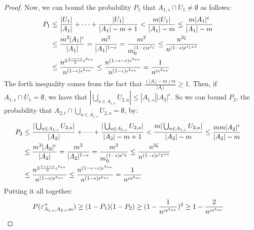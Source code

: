 \begin{lemma}[Claim 4.13]
\begin{proof}
            Now, we can bound the probability $P_1$ that $A_{1,s} \cap U_1 \neq \emptyset$ as follows:
            \[
                \begin{split}
                    P_1
                        & \leq \frac{|U_1|}{|A_1|} + \dots + \frac{|U_1|}{|A_1|-m+1}
                            < \frac{m |U_1|}{|A_1| - m}
                            \leq \frac{m |A_1|^\epsilon}{|A_1| - m} \\
                        & \leq \frac{m^2 |A_1|^\epsilon}{|A_1|}
                            = \frac{m^2}{|A_1|^{1-\epsilon}}
                            = \frac{m^2}{m_0^{\parround{1-\epsilon} \epsilon^{\ell_1}}} %
                            \leq \frac{n^{2 \zeta}}{n^{(1-\epsilon)\epsilon^{\ell_1 + 1}}} \\
                        & \leq \frac{n^{2\frac{1-\epsilon-c}{3} \epsilon^{k_{**}}}}{n^{(1-\epsilon)\epsilon^{k_{**}}}}
                            \leq \frac{n^{(1-\epsilon-c) \epsilon^{k_{**}}}}{n^{(1-\epsilon)\epsilon^{k_{**}}}}
                            = \frac{1}{n^{c \epsilon^{k_{**}}}}
                \end{split}
            \]
            The forth inequality comes from the fact that $\frac{(|A_i| - m) m}{|A_i|} \geq 1$.
            Then, if $A_{1,s} \cap U_1= \emptyset$, we have that $|\bigcup_{a \in A_{1,s}} U_{2,a}| \leq |A_{1,s}| |A_2|^\epsilon$.
            So we can bound $P_2$, the probability that $A_{2,t} \cap \bigcup_{a \in A_{1,s}} U_{2,a} = \emptyset$, by:
            \[
                \begin{split}
                    P_2
                        & \leq \frac{|\bigcup_{a \in A_{1,s}} U_{2,a}|}{|A_2|} + \dots + \frac{|\bigcup_{a \in A_{1,s}} U_{2,a}|}{|A_2|-m+1}
                            < \frac{m |\bigcup_{a \in A_{1,s}} U_{2,a}|}{|A_2| - m}
                            \leq \frac{m m |A_2|^\epsilon}{|A_2| - m} \\
                        & \leq \frac{m^3 |A_2|^\epsilon}{|A_2|}
                            = \frac{m^3}{|A_2|^{1-\epsilon}}
                            = \frac{m^3}{m_0^{\parround{1-\epsilon} \epsilon^{\ell_2}}} %
                            \leq \frac{n^{3 \zeta}}{n^{(1-\epsilon)\epsilon^{\ell_2 + 1}}} \\
                        & \leq \frac{n^{3\frac{1-\epsilon-c}{3} \epsilon^{k_{**}}}}{n^{(1-\epsilon)\epsilon^{k_{**}}}}
                            \leq \frac{n^{(1-\epsilon-c) \epsilon^{k_{**}}}}{n^{(1-\epsilon)\epsilon^{k_{**}}}}
                            = \frac{1}{n^{c \epsilon^{k_{**}}}}
                \end{split}
            \]
            Putting it all together:
            \[
                P(\varepsilon^+_{A_{1,s},A_{2,t},m})
                    \geq (1 - P_1) (1 - P_2)
                    \geq ( 1 - \frac{1}{n^{c \epsilon^{k_{**}}}} )^2
                    \geq 1 - \frac{2}{n^{c\epsilon^{k_{**}}}}
            \]
        \end{proof}
    \end{lemma}

